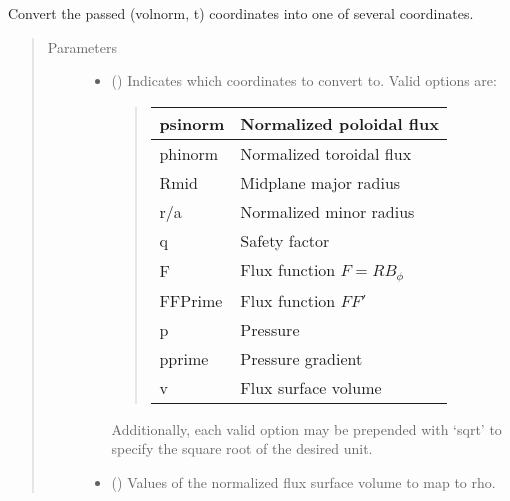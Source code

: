 \documentclass[letterpaper,10pt,english]{sphinxmanual}
\begin{document}
\begin{fulllineitems}
\begin{fulllineitems}
\label{\detokenize{eqtools:eqtools.core.Equilibrium.volnorm2rho}}
Convert the passed (volnorm, t) coordinates into one of several coordinates.
\begin{quote}\begin{description}
\item[{Parameters}] \leavevmode\begin{itemize}
\item {} 
 () \textendash{} 
Indicates which coordinates to convert to.
Valid options are:
\begin{quote}


\begin{savenotes}\sphinxattablestart
\centering
\begin{tabulary}{\linewidth}[t]{|T|T|}
\hline

psinorm
&
Normalized poloidal flux
\\
\hline
phinorm
&
Normalized toroidal flux
\\
\hline
Rmid
&
Midplane major radius
\\
\hline
r/a
&
Normalized minor radius
\\
\hline
q
&
Safety factor
\\
\hline
F
&
Flux function \(F=RB_{\phi}\)
\\
\hline
FFPrime
&
Flux function \(FF'\)
\\
\hline
p
&
Pressure
\\
\hline
pprime
&
Pressure gradient
\\
\hline
v
&
Flux surface volume
\\
\hline
\end{tabulary}
\par
\sphinxattableend\end{savenotes}
\end{quote}

Additionally, each valid option may be prepended with ‘sqrt’
to specify the square root of the desired unit.


\item {} 
 () \textendash{} Values of the normalized
flux surface volume to map to rho.


\end{itemize}
\end{description}
\end{quote}
\end{fulllineitems}
\end{fulllineitems}
\end{document}
